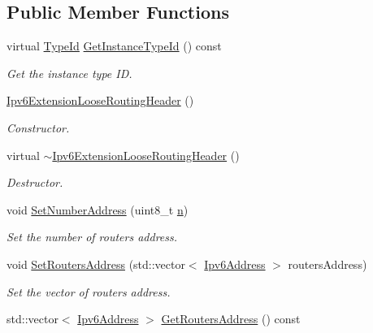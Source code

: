 \subsection*{Public Member Functions}
\begin{DoxyCompactItemize}
\item 
virtual \hyperlink{classns3_1_1TypeId}{Type\+Id} \hyperlink{classns3_1_1Ipv6ExtensionLooseRoutingHeader_ad5cfd00d113c1b6de51906f7cba115ed}{Get\+Instance\+Type\+Id} () const 
\begin{DoxyCompactList}\small\item\em Get the instance type ID. \end{DoxyCompactList}\item 
\hyperlink{classns3_1_1Ipv6ExtensionLooseRoutingHeader_a46f98a6559b1cee24651b338fdbce4d9}{Ipv6\+Extension\+Loose\+Routing\+Header} ()
\begin{DoxyCompactList}\small\item\em Constructor. \end{DoxyCompactList}\item 
virtual \hyperlink{classns3_1_1Ipv6ExtensionLooseRoutingHeader_afd9003ecca1c704b412ff0e474f05b4c}{$\sim$\+Ipv6\+Extension\+Loose\+Routing\+Header} ()
\begin{DoxyCompactList}\small\item\em Destructor. \end{DoxyCompactList}\item 
void \hyperlink{classns3_1_1Ipv6ExtensionLooseRoutingHeader_afbd5a9612a1eb9d45c5a5c6cf0eb746a}{Set\+Number\+Address} (uint8\+\_\+t \hyperlink{lte__link__budget__x2__handover__measures_8m_abdb05bc5a064cf642a06c83b3392f148}{n})
\begin{DoxyCompactList}\small\item\em Set the number of routers\textquotesingle{} address. \end{DoxyCompactList}\item 
void \hyperlink{classns3_1_1Ipv6ExtensionLooseRoutingHeader_a64a27693d231c2c047e5d8ecc2858b19}{Set\+Routers\+Address} (std\+::vector$<$ \hyperlink{classns3_1_1Ipv6Address}{Ipv6\+Address} $>$ routers\+Address)
\begin{DoxyCompactList}\small\item\em Set the vector of routers\textquotesingle{} address. \end{DoxyCompactList}\item 
std\+::vector$<$ \hyperlink{classns3_1_1Ipv6Address}{Ipv6\+Address} $>$ \hyperlink{classns3_1_1Ipv6ExtensionLooseRoutingHeader_af5bde248e1a7394df8177f124e13fb85}{Get\+Routers\+Address} () const 

\end{DoxyCompactItemize}
